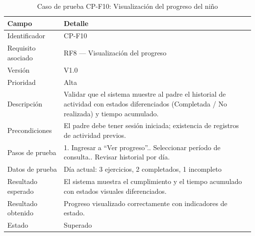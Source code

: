 				\begin{table}[H]
					\centering\small
					\caption{Caso de prueba CP-F10: Visualización del progreso del niño}
					\label{tab:cpf10}
					\begin{tabular}{p{3cm}p{12.0cm}}
						\hline
						\textbf{Campo} & \textbf{Detalle}\\
						\hline
						Identificador & CP-F10\\
						Requisito asociado & RF8 --- Visualización del progreso\\
						Versión & V1.0\\
						Prioridad & Alta\\
						Descripción & Validar que el sistema muestre al padre el historial de actividad con estados diferenciados (Completada / No realizada) y tiempo acumulado.\\
						Precondiciones & El padre debe tener sesión iniciada; existencia de registros de actividad previos.\\
						Pasos de prueba & 1. Ingresar a ``Ver progreso''.\newline 2. Seleccionar período de consulta.\newline 3. Revisar historial por día.\\
						Datos de prueba & Día actual: 3 ejercicios, 2 completados, 1 incompleto\\
						Resultado esperado & El sistema muestra el cumplimiento y el tiempo acumulado con estados visuales diferenciados.\\
						Resultado obtenido & Progreso visualizado correctamente con indicadores de estado.\\
						Estado & Superado\\
						\hline
					\end{tabular}
				\end{table}
				\tblnote
				
